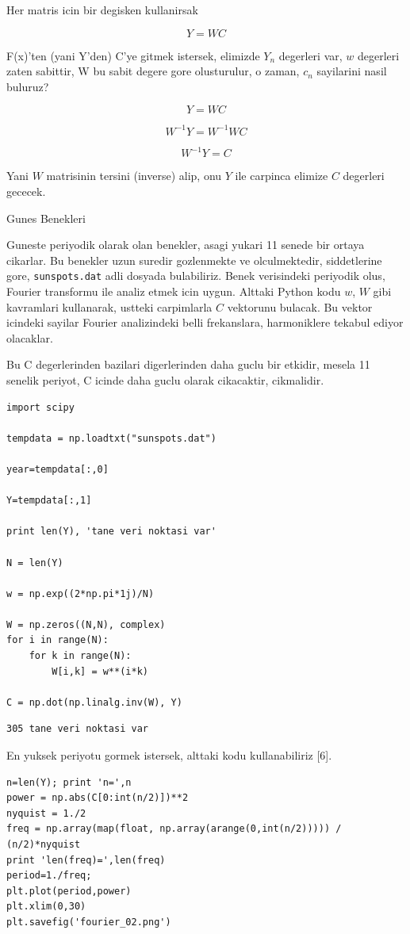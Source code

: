 \documentclass[12pt,fleqn]{article}\usepackage{../common}
\begin{document}
Her matris icin bir degisken kullanirsak

$$ Y = WC $$

F(x)'ten (yani Y'den) C'ye gitmek istersek, elimizde $Y_n$ degerleri var, $w$
degerleri zaten sabittir, W bu sabit degere gore olusturulur, o zaman, $c_n$
sayilarini nasil buluruz?

$$ Y = WC  $$

$$ W^{-1}Y = W^{-1}WC  $$

$$ W^{-1}Y = C $$

Yani $W$ matrisinin tersini (inverse) alip, onu $Y$ ile carpinca elimize $C$
degerleri gececek. 

Gunes Benekleri

Guneste periyodik olarak olan benekler, asagi yukari 11 senede bir ortaya
cikarlar. Bu benekler uzun suredir gozlenmekte ve olculmektedir,
siddetlerine gore, \verb!sunspots.dat! adli dosyada bulabiliriz. Benek
verisindeki periyodik olus, Fourier transformu ile analiz etmek icin
uygun. Alttaki Python kodu $w$, $W$ gibi kavramlari kullanarak, ustteki
carpimlarla $C$ vektorunu bulacak. Bu vektor icindeki sayilar Fourier
analizindeki belli frekanslara, harmoniklere tekabul ediyor olacaklar.

Bu C degerlerinden bazilari digerlerinden daha guclu bir etkidir, mesela 11
senelik periyot, C icinde daha guclu olarak cikacaktir, cikmalidir. 

\begin{verbatim}
import scipy

tempdata = np.loadtxt("sunspots.dat")

year=tempdata[:,0]

Y=tempdata[:,1]

print len(Y), 'tane veri noktasi var'

N = len(Y)

w = np.exp((2*np.pi*1j)/N)

W = np.zeros((N,N), complex)
for i in range(N):
    for k in range(N):
        W[i,k] = w**(i*k)
        
C = np.dot(np.linalg.inv(W), Y) 
\end{verbatim}

\begin{verbatim}
305 tane veri noktasi var
\end{verbatim}

En yuksek periyotu gormek istersek, alttaki kodu kullanabiliriz [6].

\begin{verbatim}
n=len(Y); print 'n=',n
power = np.abs(C[0:int(n/2)])**2
nyquist = 1./2
freq = np.array(map(float, np.array(arange(0,int(n/2))))) / (n/2)*nyquist
print 'len(freq)=',len(freq)
period=1./freq;
plt.plot(period,power)
plt.xlim(0,30)
plt.savefig('fourier_02.png')
\end{verbatim}
\end{document}
